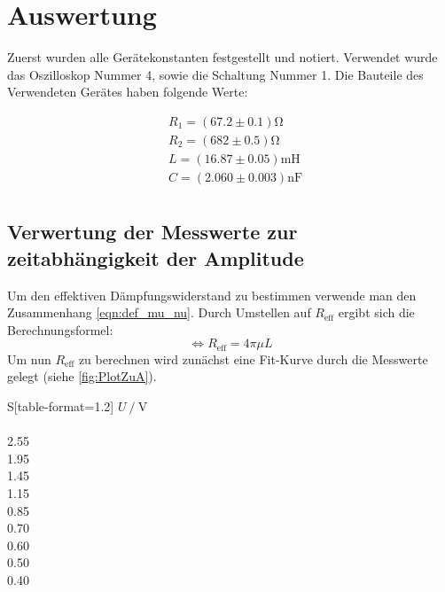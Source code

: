 \section{Auswertung}
\label{sec:Auswertung}

Zuerst wurden alle Gerätekonstanten festgestellt und notiert. Verwendet wurde das Oszilloskop Nummer 4, sowie
die Schaltung Nummer 1. Die Bauteile des Verwendeten Gerätes haben folgende Werte:

\begin{align*}
  &R_1 = (67.2 \pm 0.1) \unit{\ohm} \\
  &R_2 = (682 \pm 0.5) \unit{\ohm}  \\
  &L   = (16.87 \pm 0.05) \unit{\milli\henry} \\
  &C   = (2.060 \pm 0.003) \unit{\nano\farad} \\
\end{align*}

\subsection{Verwertung der Messwerte zur zeitabhängigkeit der Amplitude}
\label{subsec:AuswertungA}

Um den effektiven Dämpfungswiderstand zu bestimmen verwende man den Zusammenhang \eqref{eqn:def_mu_nu}.
Durch Umstellen auf $R_{\text{eff}}$ ergibt sich die Berechnungsformel:
\begin{equation}
  \label{Abklingdauer1}
  \Longleftrightarrow R_{\text{eff}} = 4\pi\mu L
\end{equation}
Um nun $R_{\text{eff}}$ zu berechnen wird zunächst eine Fit-Kurve durch die Messwerte gelegt (siehe \autoref{fig:PlotZuA}).

\begin{table}
  \centering
  \caption{Messdaten zur Zeitabhängigkeit der Amplitude.}
  \label{tab:Mess1}
  \begin{tabular}{S[table-format=1.2]}
      \toprule
      $U \mathbin{/} \unit{\volt}$ \\
       \\
      2.55 \\
      1.95 \\
      1.45 \\
      1.15 \\
      0.85 \\
      0.70 \\
      0.60 \\
      0.50 \\
      0.40 \\
  \bottomrule 
  \end{tabular}
\end{table}

